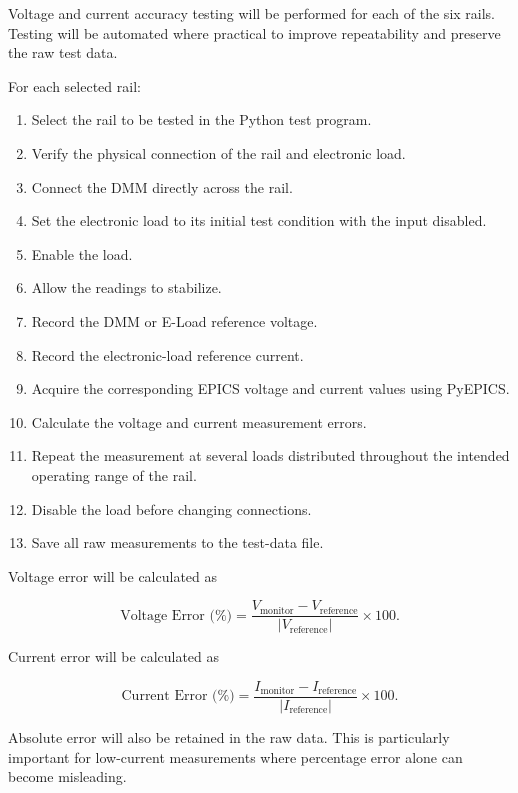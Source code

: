 Voltage and current accuracy testing will be performed for each of the six rails.
Testing will be automated where practical to improve repeatability and preserve the
raw test data.

For each selected rail:

\begin{enumerate}
	\item Select the rail to be tested in the Python test program.
	\item Verify the physical connection of the rail and electronic load.
	\item Connect the DMM directly across the rail.
	\item Set the electronic load to its initial test condition with the input disabled.
	\item Enable the load.
	\item Allow the readings to stabilize.
	\item Record the DMM or E-Load reference voltage.
	\item Record the electronic-load reference current.
	\item Acquire the corresponding EPICS voltage and current values using PyEPICS.
	\item Calculate the voltage and current measurement errors.
	\item Repeat the measurement at several loads distributed throughout the intended
	operating range of the rail.
	\item Disable the load before changing connections.
	\item Save all raw measurements to the test-data file.
\end{enumerate}

Voltage error will be calculated as

\begin{equation}
	\text{Voltage Error (\%)} =
	\frac{V_{\text{monitor}}-V_{\text{reference}}}
	{|V_{\text{reference}}|}
	\times 100.
\end{equation}

Current error will be calculated as

\begin{equation}
	\text{Current Error (\%)} =
	\frac{I_{\text{monitor}}-I_{\text{reference}}}
	{|I_{\text{reference}}|}
	\times 100.
\end{equation}

Absolute error will also be retained in the raw data. This is particularly important
for low-current measurements where percentage error alone can become misleading.


